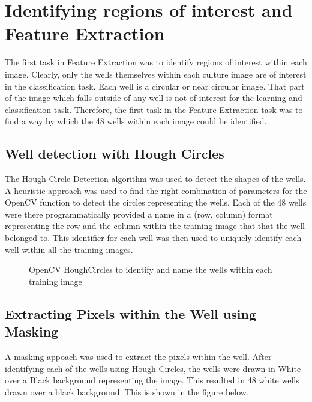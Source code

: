 \documentclass[a4paper,twoside,12pt]{report}
\begin{document}
\section{Identifying regions of interest and Feature Extraction} 

The first task in Feature Extraction was to identify regions of interest within each image.   Clearly, only the wells themselves within each culture image are of interest in the classification task.    Each well is a circular or near circular image.  That part of the image which falls outside of any well is not of interest for the learning and classification task.    Therefore, the first task in the Feature Extraction task was to find a way by which the 48 wells within each image could be identified.  

\subsection{Well detection with Hough Circles} 
The Hough Circle Detection algorithm was used to detect the shapes of the wells.  A heuristic approach was used to find the right combination of parameters for the OpenCV function to detect the circles representing the wells.  
Each of the 48 wells were there programmatically provided a name in a (row, column) format representing the row and the column within the training image that that the well belonged to.  This identifier for each well was then used to uniquely identify each well within all the training images.    

\begin{figure}[!htbp]
\centering
{}\hfill
{}
\caption{OpenCV HoughCircles to identify and name the wells within each training image}
\label{fig:subfigures}
\end{figure}


\subsection{Extracting Pixels within the Well using Masking} 
A masking appoach was used to extract the pixels within the well.   After identifying each of the wells using Hough Circles, the wells were drawn in White over a Black background representing the image.    This resulted in 48 white wells drawn over a black background.    This is shown in the figure below. 
\end{document}
